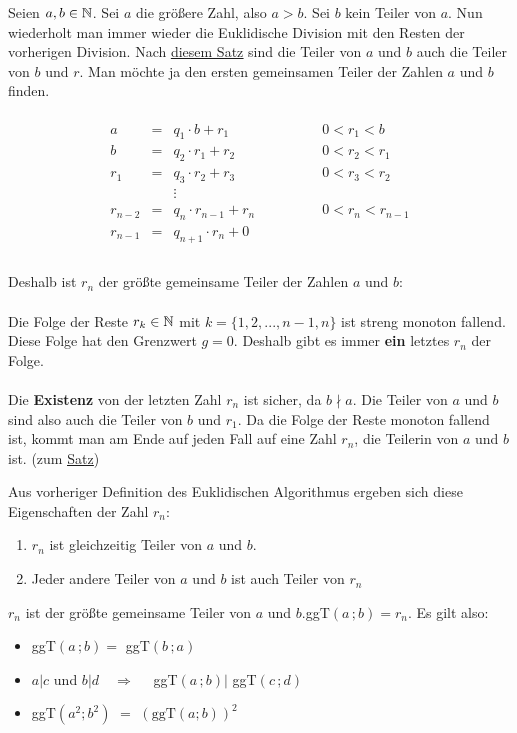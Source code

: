\documentclass[../MAIN/main.tex]{subfiles}
\begin{document}
\begin{Definition}

Seien $a,b \in \mathbb{N}$. Sei $a$ die größere Zahl, also $a > b$. Sei $b$ kein Teiler von $a$. Nun wiederholt man immer wieder die Euklidische Division mit den Resten der vorherigen Division. Nach \hyperlink{teiler_ab_teiler_br}{\textcolor{titlepagecolor}{\underline{diesem Satz}}} sind die Teiler von $a$ und $b$ auch die Teiler von $b$ und $r$. Man möchte ja den ersten gemeinsamen Teiler der Zahlen $a$ und $b$ finden.\\\\
$$
\begin{array}{rccl}
a & = & q_{1} \cdot b + r_{1} \qquad \qquad &0 < r_{1}  < b \\
b & = & q_{2} \cdot r_{1} + r_{2} \qquad \qquad &0 < r_{2}  < r_{1} \\
r_{1} & = & q_{3} \cdot r_{2} + r_{3} \qquad \qquad &0 < r_{3}  < r_{2} \\
 && \vdots & \\
r_{n-2} & = & q_{n} \cdot r_{n-1} + r_{n} \qquad \qquad &0 < r_{n}  < r_{n-1} \\
r_{n-1} & = & q_{n+1} \cdot r_{n} + 0 \qquad \qquad &  \\
\end{array}
$$\\
Deshalb ist $r_{n}$ der größte gemeinsame Teiler der Zahlen $a$ und $b$:\\\\
Die Folge der Reste $r_{k} \in \mathbb{N}$ mit $k = \{1, 2, ..., n-1, n\}$ ist streng monoton fallend. Diese Folge hat den Grenzwert $g = 0$. Deshalb gibt es immer \textbf{ein} letztes $r_{n}$ der Folge.\\\\
Die \textbf{Existenz} von der letzten Zahl $r_{n}$ ist sicher, da $b \nmid a$. Die Teiler von $a$ und $b$ sind also auch die Teiler von $b$ und $r_{1}$. Da die Folge der Reste monoton fallend ist, kommt man am Ende auf jeden Fall auf eine Zahl $r_{n}$, die Teilerin von $a$ und $b$ ist. (zum \hyperlink{teiler_ab_teiler_br}{\textcolor{titlepagecolor}{\underline{Satz}}})
\end{Definition}

\begin{Theorem}
Aus vorheriger Definition des Euklidischen Algorithmus ergeben sich diese Eigenschaften der Zahl $r_{n}$:
\begin{enumerate}
\item $r_{n}$ ist gleichzeitig Teiler von $a$ und $b$.
\item Jeder andere Teiler von $a$ und $b$ ist auch Teiler von $r_{n}$
\end{enumerate}
$r_{n}$ ist der größte gemeinsame Teiler von $a$ und $b$.\quad ggT$(a\,;b) = r_{n}$. Es gilt also:
\begin{itemize}
\item ggT$(a\,;b) =$ ggT$(b\,;a)$
\item $a | c$ und $b | d \quad \Rightarrow \quad$ ggT$(a\,;b) |$ ggT$(c\,;d)$
\item ggT$(a^2;b^2)$ $=$ $\left(\text{ggT}(a;b)\right)^2$\\
\end{itemize}
\end{Theorem}
\end{document}
